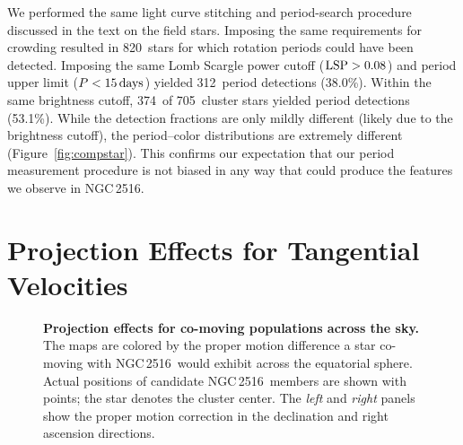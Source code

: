 \documentclass[12pt,twocolumn,tighten]{aastex63}
\newcommand{\cn}{NGC\,2516} %
\newcommand{\ncompstardenominator}{820} %
\newcommand{\ncompstarnumerator}{312} %
\newcommand{\ncompfrac}{38.0\%} %
\newcommand{\nautovscompstardenominator}{705} %
\newcommand{\nautovscompstarnumerator}{374} %
\newcommand{\nautofrac}{53.1\%} %
\begin{document}
We performed the same light curve stitching and period-search
procedure discussed in the text on the field stars.
Imposing the same requirements for crowding resulted in
\ncompstardenominator\ stars for which rotation periods could have
been detected.  Imposing the same Lomb Scargle power cutoff (${\rm
LSP}>0.08$) and period upper limit ($P<15\,{\rm days}$) yielded
\ncompstarnumerator\ period detections (\ncompfrac).  Within the same
brightness cutoff, \nautovscompstarnumerator\ of
\nautovscompstardenominator\ cluster stars yielded period detections
(\nautofrac).  While the detection fractions are only mildly
different (likely due to the brightness cutoff), the period--color
distributions are extremely different
(Figure~\ref{fig:compstar}).
This confirms our expectation that our period measurement procedure is
not biased in any way that could produce the features we observe in
\cn.


\section{Projection Effects for Tangential Velocities}
\label{app:vproj}

\begin{figure}[t]
	\begin{center}
		\leavevmode
	\end{center}
	\vspace{-0.5cm}
  \caption{ {\bf Projection effects for co-moving populations across
  the sky.} The maps are colored by the proper motion difference a star
  co-moving with \cn\ would exhibit across the equatorial sphere.
  Actual positions of candidate \cn\ members are shown with points;
  the star denotes the cluster center.
  The {\it left} and {\it right} panels show the proper motion correction in
  the declination and right ascension directions.
	\label{fig:vproj}
	}
\end{figure}
\end{document}

